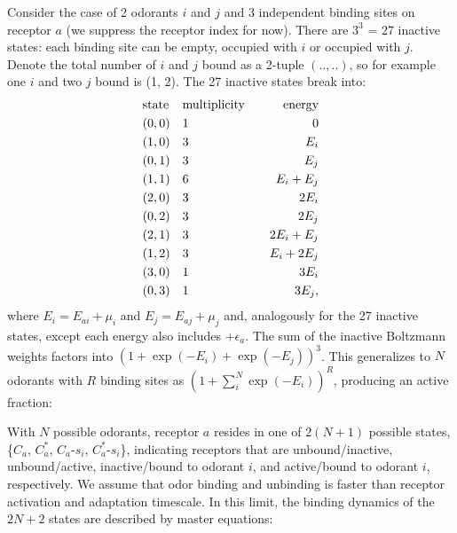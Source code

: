 \documentclass[9pt,twoside]{pnas-new}
\begin{document}
Consider the case of 2 odorants $i$ and $j$ and 3 independent binding sites on receptor $a$ (we suppress the receptor index for now). There are $3^3$ = 27 inactive states: each binding site can be empty, occupied with $i$ or occupied with $j$. Denote the total number of $i$ and $j$ bound as a 2-tuple $(..,..)$, so for example one $i$ and two $j$ bound is (1, 2). The 27 inactive states break into:
\begin{align}
    &\textup{state} && \textup{multiplicity} &&& \textup{energy} \nonumber \\
    &(0, 0)         && 1                     &&&  0 \nonumber \\
    &(1, 0)         && 3                     &&&  E_i \nonumber \\
    &(0, 1)         && 3                     &&&  E_j \nonumber \\
    &(1, 1)         && 6                     &&&  E_i + E_j \nonumber \\
    &(2, 0)         && 3                     &&&  2E_i \nonumber \\
    &(0, 2)         && 3                     &&&  2E_j \nonumber \\
    &(2, 1)         && 3                     &&&  2E_i + E_j \nonumber \\
    &(1, 2)         && 3                     &&&  E_i + 2E_j \nonumber \\
    &(3, 0)         && 1                     &&&  3E_i \nonumber \\
    &(0, 3)         && 1                     &&&  3E_j \nonumber,
\end{align}
where $E_i = E_{ai} + \mu_i$ and $E_j = E_{aj} + \mu_j$ and, analogously for the 27 inactive states, except each energy also includes $+\epsilon_a$. The sum of the inactive Boltzmann weights factors into $(1 + \exp(-E_i) + \exp(-E_j))^3$. This generalizes to $N$ odorants with $R$ binding sites as $(1 + \sum_i^N \exp(-E_i))^R$, producing an active fraction:

\fi












\iffalse

With $N$ possible odorants, receptor $a$ resides in one of $2(N+1)$ possible states, \{$C_a$, $C^*_a$, $C_a$-$s_i$, $C^*_a$-$s_i$\}, indicating receptors that are unbound/inactive, unbound/active, inactive/bound to odorant $i$, and active/bound to odorant $i$, respectively. We assume that odor binding and unbinding is faster than receptor activation and adaptation timescale. In this limit, the binding dynamics of the $2N + 2$ states are described by master equations:
\end{document}
